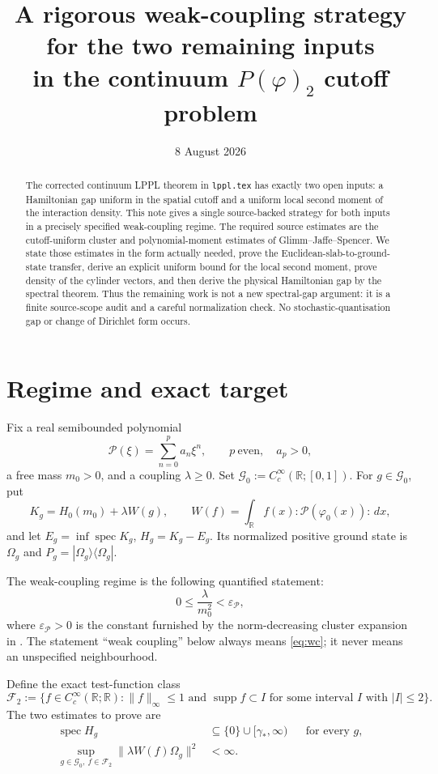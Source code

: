 \documentclass[11pt,a4paper]{article}
\title{A rigorous weak-coupling strategy for the two remaining inputs\\
in the continuum $P(\varphi)_2$ cutoff problem}
\author{}
\date{8 August 2026}
\theoremstyle{remark}
\newcommand{\R}{\mathbb R}
\newcommand{\Om}{\Omega}
\DeclareMathOperator{\supp}{supp}
\DeclareMathOperator{\spec}{spec}
\begin{document}
\maketitle

\begin{abstract}
The corrected continuum LPPL theorem in \texttt{lppl.tex} has exactly two open inputs: a
Hamiltonian gap uniform in the spatial cutoff and a uniform local second moment of the
interaction density.  This note gives a single source-backed strategy for both inputs in a
precisely specified weak-coupling regime.  The required source estimates are the cutoff-uniform
cluster and polynomial-moment estimates of Glimm--Jaffe--Spencer.  We state those estimates in the
form actually needed, prove the Euclidean-slab-to-ground-state transfer, derive an explicit
uniform bound for the local second moment, prove density of the cylinder vectors, and then derive
the physical Hamiltonian gap by the spectral theorem.  Thus the remaining work is not a new
spectral-gap argument: it is a finite source-scope audit and a careful normalization check.
No stochastic-quantisation gap or change of Dirichlet form occurs.
\end{abstract}

\section{Regime and exact target}

Fix a real semibounded polynomial
\[
 \mathscr P(\xi)=\sum_{n=0}^{p}a_n\xi^n,
 \qquad p\ \text{even},\quad a_p>0,
\]
a free mass $m_0>0$, and a coupling $\lambda\ge0$.  Set
$\mathcal G_0:=C_c^\infty(\R;[0,1])$.  For $g\in\mathcal G_0$, put
\[
 K_g=H_0(m_0)+\lambda W(g),\qquad
 W(f)=\int_\R f(x):\mathscr P(\varphi_0(x)):\,dx,
\]
and let $E_g=\inf\spec K_g$, $H_g=K_g-E_g$.  Its normalized positive ground
state is $\Om_g$ and $P_g=|\Om_g\rangle\langle\Om_g|$.

The weak-coupling regime is the following quantified statement:
\begin{equation}\label{eq:wc}
 0\le \frac{\lambda}{m_0^2}<\varepsilon_{\mathscr P},                 \tag{WC}
\end{equation}
where $\varepsilon_{\mathscr P}>0$ is the constant furnished by the norm-decreasing
cluster expansion in \cite[Thms.~1.1.7--1.1.8]{GJS}.  The statement ``weak coupling'' below
always means \eqref{eq:wc}; it never means an unspecified neighbourhood.

Define the exact test-function class
\[
 \mathcal F_2:=\{f\in C_c^\infty(\R;\R):\|f\|_\infty\le1
 \text{ and }\supp f\subset I\text{ for some interval }I\text{ with }|I|\le2\}.
\]
The two estimates to prove are
\begin{align}
 \spec H_g&\subseteq\{0\}\cup[\gamma_*,\infty)
 &&\text{for every }g,                                             \tag{G}\label{eq:G}\\
 \sup_{g\in\mathcal G_0,\ f\in\mathcal F_2}
 \|\lambda W(f)\Om_g\|^2&<\infty .                               \tag{M$_2$}\label{eq:M2}
\end{align}
\end{document}
